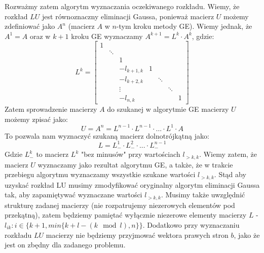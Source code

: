 \documentclass[11pt]{article}
\begin{document}
        \newline\newline
        Rozważmy zatem algorytm wyznaczania oczekiwanego rozkładu. Wiemy, że rozkład $LU$ jest równoznaczny eliminacji Gaussa, ponieważ macierz $U$ możemy zdefiniować jako $A^n$ (macierz $A$ w $n$-tym kroku metody GE). Wiemy jednak, że $A^1 = A$ oraz w $k+1$ kroku GE wyznaczamy $A^{k+1} = L^k \cdot A^k$, gdzie:
        $$
        L^k =
        \begin{bmatrix}
            1 &        &            &   &        &        & \\
              & \ddots &            &   &        &        & \\
              &        & 1          &   &        &        & \\
              &        & -l_{k+1,k} & 1 &        &        & \\
              &        & -l_{k+2,k} &   & \ddots &        & \\
              &        & \vdots     &   &        & \ddots & \\
              &        & -l_{n,k}   &   &        &        & 1

        \end{bmatrix}
        $$
        Zatem sprowadzenie macierzy $A$ do szukanej w algorytmie GE macierzy $U$ możemy zpisać jako:
        $$ U = A^n = L^{n-1} \cdot L^{n-1} \cdot ... \cdot L^1 \cdot A $$
        To pozwala nam wyznaczyć szukaną macierz dolnotrójkątną jako:
        $$ L = L_-^1 \cdot L_-^2 \cdot ... \cdot L_-^{n-1} $$
        Gdzie $L_-^k$ to macierz $L^k$ "bez minusów" przy wartościach $l_{>k,k}$.
        \newpage
        \noindent
        Wiemy zatem, że macierz $U$ wyznaczamy jako rezultat algorytmu GE, a także, że w trakcie przebiegu algorytmu wyznaczamy wszystkie szukane wartości $l_{>k,k}$. Stąd aby uzyskać rozkład LU musimy zmodyfikować oryginalny algorytm eliminacji Gaussa tak, aby zapamiętywać wyznaczane wartości $l_{>k,k}$.
        \newline
        Musimy także uwzględnić strukturę zadanej macierzy (nie rozpatrujemy niezerowych elementów pod przekątną), zatem będziemy pamiętać wyłącznie niezerowe elementy macierzy $L$ - $l_{ik}: i \in \{k+1, min\{k + l - (k \mod l), n\}\}$.
        \newline
        Dodatkowo przy wyznaczaniu rozkładu $LU$ macierzy nie będziemy przyjmować wektora prawych stron $b$, jako że jest on zbędny dla zadanego problemu.
\end{document}
